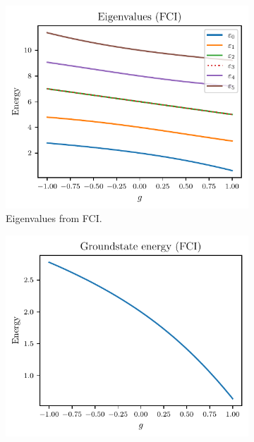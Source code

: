 \begin{figure}[htbp]
    \centering
    \begin{subfigure}[b]{0.45\linewidth}
        \centering
        \includegraphics[width=\textwidth]{figures/b_eigenvalues_energy.pdf}
        \caption{
            Eigenvalues from FCI.\label{fig:b_eigenvalues}
        }
    \end{subfigure}
    \hfill
    \begin{subfigure}[b]{0.46\linewidth}
        \centering
        \includegraphics[width=\textwidth]{figures/b_groundstate_energy.pdf}

\end{subfigure}
\end{figure}
